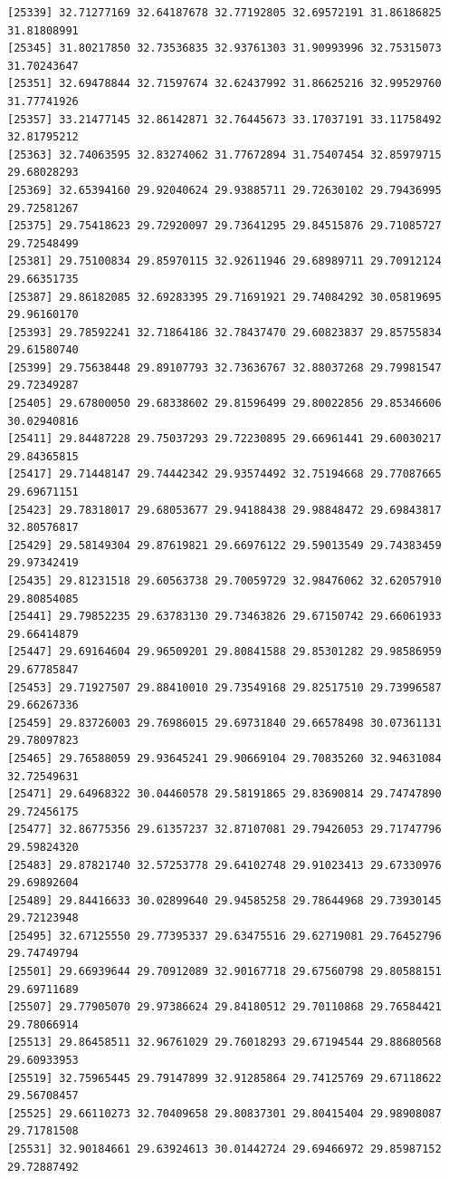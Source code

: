 \documentclass[
  letterpaper,
  DIV=11,
  numbers=noendperiod]{scrartcl}
\begin{document}
\begin{verbatim}
[25339] 32.71277169 32.64187678 32.77192805 32.69572191 31.86186825 31.81808991
[25345] 31.80217850 32.73536835 32.93761303 31.90993996 32.75315073 31.70243647
[25351] 32.69478844 32.71597674 32.62437992 31.86625216 32.99529760 31.77741926
[25357] 33.21477145 32.86142871 32.76445673 33.17037191 33.11758492 32.81795212
[25363] 32.74063595 32.83274062 31.77672894 31.75407454 32.85979715 29.68028293
[25369] 32.65394160 29.92040624 29.93885711 29.72630102 29.79436995 29.72581267
[25375] 29.75418623 29.72920097 29.73641295 29.84515876 29.71085727 29.72548499
[25381] 29.75100834 29.85970115 32.92611946 29.68989711 29.70912124 29.66351735
[25387] 29.86182085 32.69283395 29.71691921 29.74084292 30.05819695 29.96160170
[25393] 29.78592241 32.71864186 32.78437470 29.60823837 29.85755834 29.61580740
[25399] 29.75638448 29.89107793 32.73636767 32.88037268 29.79981547 29.72349287
[25405] 29.67800050 29.68338602 29.81596499 29.80022856 29.85346606 30.02940816
[25411] 29.84487228 29.75037293 29.72230895 29.66961441 29.60030217 29.84365815
[25417] 29.71448147 29.74442342 29.93574492 32.75194668 29.77087665 29.69671151
[25423] 29.78318017 29.68053677 29.94188438 29.98848472 29.69843817 32.80576817
[25429] 29.58149304 29.87619821 29.66976122 29.59013549 29.74383459 29.97342419
[25435] 29.81231518 29.60563738 29.70059729 32.98476062 32.62057910 29.80854085
[25441] 29.79852235 29.63783130 29.73463826 29.67150742 29.66061933 29.66414879
[25447] 29.69164604 29.96509201 29.80841588 29.85301282 29.98586959 29.67785847
[25453] 29.71927507 29.88410010 29.73549168 29.82517510 29.73996587 29.66267336
[25459] 29.83726003 29.76986015 29.69731840 29.66578498 30.07361131 29.78097823
[25465] 29.76588059 29.93645241 29.90669104 29.70835260 32.94631084 32.72549631
[25471] 29.64968322 30.04460578 29.58191865 29.83690814 29.74747890 29.72456175
[25477] 32.86775356 29.61357237 32.87107081 29.79426053 29.71747796 29.59824320
[25483] 29.87821740 32.57253778 29.64102748 29.91023413 29.67330976 29.69892604
[25489] 29.84416633 30.02899640 29.94585258 29.78644968 29.73930145 29.72123948
[25495] 32.67125550 29.77395337 29.63475516 29.62719081 29.76452796 29.74749794
[25501] 29.66939644 29.70912089 32.90167718 29.67560798 29.80588151 29.69711689
[25507] 29.77905070 29.97386624 29.84180512 29.70110868 29.76584421 29.78066914
[25513] 29.86458511 32.96761029 29.76018293 29.67194544 29.88680568 29.60933953
[25519] 32.75965445 29.79147899 32.91285864 29.74125769 29.67118622 29.56708457
[25525] 29.66110273 32.70409658 29.80837301 29.80415404 29.98908087 29.71781508
[25531] 32.90184661 29.63924613 30.01442724 29.69466972 29.85987152 29.72887492

\end{verbatim}
\end{document}
